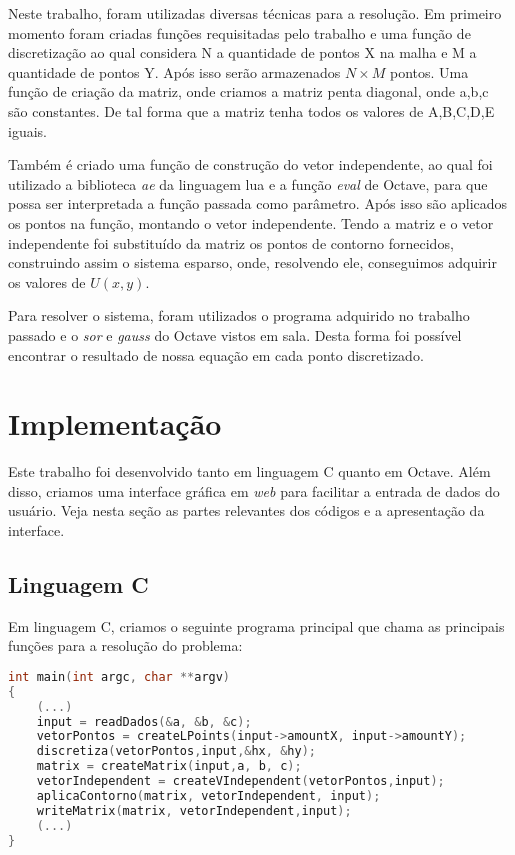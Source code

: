 \documentclass[
	11pt,				%
	oneside,			%
	a4paper,			%
	english,			%
	brazil,				%
	]{article}
\begin{document}
Neste trabalho, foram utilizadas diversas técnicas para a resolução. Em primeiro momento foram criadas funções requisitadas pelo trabalho e uma função de discretização ao qual considera N a quantidade de pontos X na malha e M a quantidade de pontos Y. Após isso serão armazenados $N \times M$ pontos. Uma função de criação da matriz, onde criamos a matriz penta diagonal, onde a,b,c são constantes. De tal forma que a matriz tenha todos os valores de A,B,C,D,E iguais.

Também é criado uma função de construção do vetor independente, ao qual foi utilizado a biblioteca \textit{ae} da linguagem lua e a função \textit{eval} de Octave, para que possa ser interpretada a função passada como parâmetro. Após isso são aplicados os pontos na função, montando o vetor independente. Tendo a matriz e o vetor independente foi substituído da matriz os pontos de contorno fornecidos, construindo assim o sistema esparso, onde, resolvendo ele, conseguimos adquirir os valores de $U(x,y)$.

Para resolver o sistema, foram utilizados o programa adquirido no trabalho passado e o \textit{sor} e \textit{gauss} do Octave vistos em sala. Desta forma foi possível encontrar o resultado de nossa equação em cada ponto discretizado.

\section{Implementação}
Este trabalho foi desenvolvido tanto em linguagem C quanto em Octave. Além disso, criamos uma interface gráfica em \textit{web} para facilitar a entrada de dados do usuário. Veja nesta seção as partes relevantes dos códigos e a apresentação da interface.

\subsection{Linguagem C}
Em linguagem C, criamos o seguinte programa principal que chama as principais funções para a resolução do problema:

\begin{lstlisting}[language=C, caption=Função \textit{main}]
int main(int argc, char **argv)
{
	(...)
	input = readDados(&a, &b, &c);
	vetorPontos = createLPoints(input->amountX, input->amountY);
	discretiza(vetorPontos,input,&hx, &hy);
	matrix = createMatrix(input,a, b, c);
	vetorIndependent = createVIndependent(vetorPontos,input);
	aplicaContorno(matrix, vetorIndependent, input);
	writeMatrix(matrix, vetorIndependent,input);
	(...)
}
\end{lstlisting}
\end{document}
